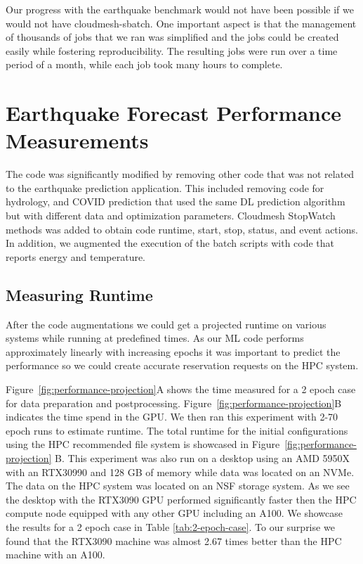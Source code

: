 \documentclass[utf8]{FrontiersinVancouver} %
\begin{document}
Our progress with the earthquake benchmark would not have been
possible if we would not have cloudmesh-sbatch. One important aspect
is that the management of thousands of jobs that we ran was simplified
and the jobs could be created easily while fostering
reproducibility. The resulting jobs were run over a time period of a
month, while each job took many hours to complete.





\section{Earthquake Forecast Performance Measurements}
\label{sec:perf-main}

The code was significantly modified by removing other code that was
not related to the earthquake prediction application. This included
removing code for hydrology, and COVID prediction that used the same
DL prediction algorithm but with different data and optimization
parameters. Cloudmesh StopWatch methods was added to obtain code 
runtime, start, stop, status, and event actions. In addition, we 
augmented the execution of the batch scripts with code that reports 
energy and temperature.

\subsection{Measuring Runtime}
\label{sec:perf-runtime}

After the code augmentations we could get a projected runtime on 
various systems while running at predefined times. As our ML code 
performs approximately linearly with increasing epochs it was 
important to predict the performance so we could create accurate
reservation requests on the HPC system.

Figure~\ref{fig:performance-projection}A shows the time measured for
a 2 epoch case for data preparation and postprocessing. 
Figure~\ref{fig:performance-projection}B indicates the time spend in the GPU.
We then ran this experiment with 2-70 epoch runs to estimate runtime.
The total runtime for the initial configurations using the HPC recommended
file system is showcased in Figure~\ref{fig:performance-projection} B. 
This experiment was also run on a desktop using an AMD 5950X with an 
RTX30990 and 128 GB of memory while data was located on an NVMe. 
The data on the HPC system was located on an NSF storage system.  As 
we see the desktop with the RTX3090 GPU performed significantly faster 
then the HPC compute node equipped with any other GPU including an 
A100.  We showcase the results for a 2 epoch case in Table \ref{tab:2-epoch-case}. 
To our surprise we found that the RTX3090 machine was almost 2.67 times 
better than the HPC machine with an A100.
\end{document}
